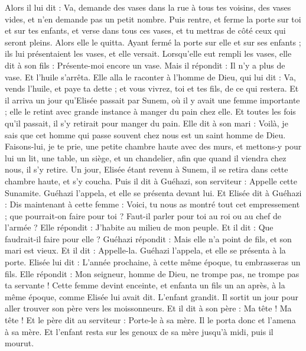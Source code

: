 \begin{multicols}{2}
Alors il lui dit : Va, demande des vases dans la rue à tous tes voisins, des vases vides, et n’en demande pas un petit nombre.
Puis rentre, et ferme la porte sur toi et sur tes enfants, et verse dans tous ces vases, et tu mettras de côté ceux qui seront pleins.
Alors elle le quitta. Ayant fermé la porte sur elle et sur ses enfants ; ils lui présentaient les vases, et elle versait.
Lorsqu’elle eut rempli les vases, elle dit à son fils : Présente-moi encore un vase. Mais il répondit : Il n’y a plus de vase. Et l’huile s’arrêta.
Elle alla le raconter à l’homme de Dieu, qui lui dit : Va, vends l’huile, et paye ta dette ; et vous vivrez, toi et tes fils, de ce qui restera.
Et il arriva un jour qu’Elisée passait par Sunem, où il y avait une femme importante ; elle le retint avec grande instance à manger du pain chez elle. Et toutes les fois qu’il passait, il s’y retirait pour manger du pain.
Elle dit à son mari : Voilà, je sais que cet homme qui passe souvent chez nous est un saint homme de Dieu.
Faisons-lui, je te prie, une petite chambre haute avec des murs, et mettons-y pour lui un lit, une table, un siège, et un chandelier, afin que quand il viendra chez nous, il s’y retire.
Un jour, Elisée étant revenu à Sunem, il se retira dans cette chambre haute, et s’y coucha.
Puis il dit à Guéhazi, son serviteur : Appelle cette Sunamite. Guéhazi l’appela, et elle se présenta devant lui.
Et Elisée dit à Guéhazi : Dis maintenant à cette femme : Voici, tu nous as montré tout cet empressement ; que pourrait-on faire pour toi ? Faut-il parler pour toi au roi ou au chef de l’armée ? Elle répondit : J’habite au milieu de mon peuple.
Et il dit : Que faudrait-il faire pour elle ? Guéhazi répondit : Mais elle n’a point de fils, et son mari est vieux.
Et il dit : Appelle-la. Guéhazi l’appela, et elle se présenta à la porte.
Elisée lui dit : L’année prochaine, à cette même époque, tu embrasseras un fils. Elle répondit : Mon seigneur, homme de Dieu, ne trompe pas, ne trompe pas ta servante !
Cette femme devint enceinte, et enfanta un fils un an après, à la même époque, comme Elisée lui avait dit.
L’enfant grandit. Il sortit un jour pour aller trouver son père vers les moissonneurs.
Et il dit à son père : Ma tête ! Ma tête ! Et le père dit au serviteur : Porte-le à sa mère.
Il le porta donc et l’amena à sa mère. Et l’enfant resta sur les genoux de sa mère jusqu’à midi, puis il mourut.

\end{multicols}
